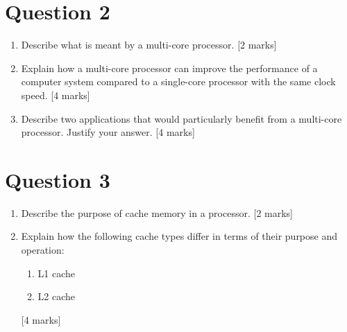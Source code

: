 \documentclass[11pt,a4paper]{article}
\begin{document}
\newpage

\section*{Question 2}
\begin{enumerate}[label=(\alph*)]
    \item Describe what is meant by a multi-core processor. [2 marks]
    
    \vspace{3cm}
    
    \item Explain how a multi-core processor can improve the performance of a computer system compared to a single-core processor with the same clock speed. [4 marks]
    
    \vspace{5cm}
    
    \item Describe two applications that would particularly benefit from a multi-core processor. Justify your answer. [4 marks]
    
    \vspace{5cm}
\end{enumerate}

\newpage

\section*{Question 3}
\begin{enumerate}[label=(\alph*)]
    \item Describe the purpose of cache memory in a processor. [2 marks]
    
    \vspace{3cm}
    
    \item Explain how the following cache types differ in terms of their purpose and operation:
    \begin{enumerate}[label=(\roman*)]
        \item L1 cache
        \item L2 cache
    \end{enumerate}
    [4 marks]
    
    \vspace{6cm}
\end{enumerate}

\newpage
\end{document}
